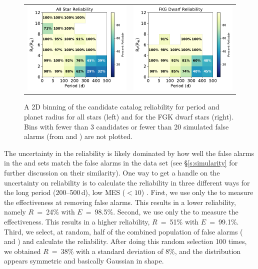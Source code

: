 \begin{figure}[htb]
\begin{center}
\begin{tabular}{cc}
\includegraphics[width=0.5\linewidth]{f11-left.pdf} &
\includegraphics[width=0.5\linewidth]{f11-right.pdf}
\end{tabular}
\caption{A 2D binning of the candidate catalog reliability for period and planet radius for all stars (left) and for the FGK dwarf stars (right). Bins with fewer than 3 candidates or fewer than 20 simulated false alarms (from \invtce{} and \scrtce{}) are not plotted.}
\label{f:prReliability}
\end{center}
\end{figure}


The uncertainty in the reliability is likely dominated by how well the false alarms in the \scrtce{} and \invtce{} sets match the false alarms in the \opstce{} data set (see \S\ref{s:simularity} for further discussion on their similarity).  One way to get a handle on the uncertainty on reliability is to calculate the reliability in three different ways for the long period (200--500\,d), low MES ($<10$) .  First, we use only the  to measure the effectiveness at removing false alarms. This results in a lower reliability, namely $R$~=~24\% with $E$~=~98.5\%. Second, we use only the  to measure the effectiveness. This results in a higher reliability, $R$~=~51\% with $E$~=~99.1\%. Third, we select, at random, half of the combined population of false alarms (\scrtce{} and \invtce{}) and calculate the reliability. After doing this random selection 100 times, we obtained $R$~=~38\% with a standard deviation of 8\%, and the distribution appears symmetric and basically Gaussian in shape.  

